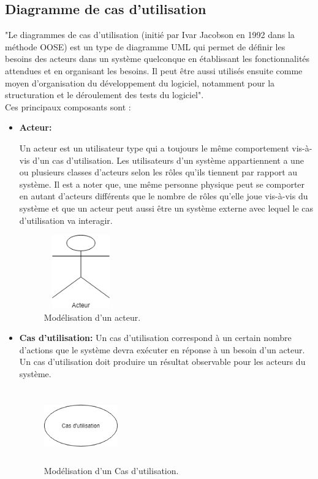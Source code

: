 \subsection{Diagramme de cas d'utilisation}
"Le diagrammes de cas d'utilisation (initié par Ivar Jacobson en 1992 dans la méthode OOSE) est un type de diagramme UML qui permet de définir les besoins des acteurs dans un système quelconque en établissant les fonctionnalités attendues et en organisant les besoins. Il peut être aussi utilisés ensuite comme moyen d’organisation du développement du logiciel, notamment pour la structuration et le déroulement des tests du logiciel".\cite{uml}\\

Ces principaux composants sont :

\begin{itemize}
	
	\item \textbf{Acteur:}
	
	Un acteur est un utilisateur type qui a toujours le même comportement vis-à-vis d’un cas d’utilisation. Les utilisateurs d'un système appartiennent a une ou plusieurs classes d’acteurs selon les rôles qu’ils tiennent par rapport au système. Il est a noter que, une même personne physique peut se comporter en autant d’acteurs différents que le nombre de rôles qu’elle joue vis-à-vis du système et que un acteur peut aussi être un système externe avec lequel le cas d’utilisation va interagir.\cite{uml}
	
	\begin{figure}[H]
		\centering
		\includegraphics[height=90pt,width=90pt]{img/chapter3/ActeurUML.png}
		\caption{Modélisation d'un acteur.}
	\end{figure}
	
	
	\item \textbf{Cas d'utilisation:}
	Un cas d’utilisation correspond à un certain nombre d’actions que le système devra exécuter en réponse à un besoin d’un acteur. Un cas d’utilisation doit produire un résultat observable pour les acteurs du système.
	
\begin{figure}[H]
	\centering
	\includegraphics[height=90pt,width=90pt]{img/chapter3/CasutilisationUML.png}
	\caption{Modélisation d'un Cas d'utilisation.}
\end{figure}



\end{itemize}
